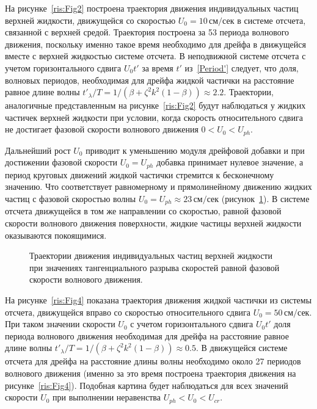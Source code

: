 На рисунке~\ref{ris:Fig2} построена траектория движения индивидуальных частиц верхней жидкости, движущейся со скоростью $ U_{0}=10\, \text{см/сек} $  в системе отсчета, связанной с верхней средой. 
Траектория построена за 53 периода волнового движения, поскольку именно такое время необходимо для дрейфа в движущейся вместе с верхней жидкостью системе отсчета. В неподвижной системе отсчета с учетом горизонтального сдвига $ U_{0} t' $ за время $ t'$  из~\eqref{Period'} следует, что доля, волновых периодов, необходимая для дрейфа жидкой частички на расстояние равное длине волны $ t'_{\lambda}/T=1/\left( \beta+\zeta^{2}k^{2}\left( 1-\beta \right) \right) \approx 2.2 $.
Траектории, аналогичные представленным на рисунке~\ref{ris:Fig2} будут наблюдаться у жидких частичек верхней жидкости при условии, когда скорость относительного сдвига не достигает фазовой скорости волнового движения $ 0<U_{0}<U_{ph} $.

Дальнейший рост $ U_{0} $ приводит к уменьшению модуля дрейфовой добавки и при достижении фазовой скорости $ U_{0}=U_{ph} $ добавка принимает нулевое значение, а период круговых движений жидкой частички стремится к бесконечному значению. Что соответствует равномерному и прямолинейному движению жидких частиц с фазовой скоростью волны $ U_{0}=U_{ph}\approx 23 \, \text{см/сек} $ (рисунок~\ref{ris:Fig3}). В системе отсчета движущейся в том же направлении со скоростью, равной фазовой скорости волнового движения поверхности, жидкие частицы верхней жидкости оказываются покоящимися.

\begin{figure}[ht]
	\caption{Траектории движения индивидуальных частиц верхней жидкости при значениях тангенциального разрыва скоростей равной фазовой скорости волнового движения.}
	\label{ris:Fig3}
\end{figure}

На рисунке~\ref{ris:Fig4} показана траектория движения жидкой частички из системы отсчета, движущейся вправо со скоростью относительного сдвига $ U_{0}=50\, \text{см/сек} $. При таком значении скорости $ U_{0} $ с учетом горизонтального сдвига $ U_{0} t' $ доля периода волнового движения необходимая для дрейфа на расстояние равное длине волны  $ t'_{\lambda}/T=1/\left( \beta+\zeta^{2}k^{2}\left( 1-\beta \right) \right) \approx 0.5 $. В движущейся системе отсчета для дрейфа на расстояние длины волны необходимо около 27 периодов волнового движения (именно за это время построена траектория движения на рисунке~\ref{ris:Fig4}).  Подобная картина будет наблюдаться для всех значений скорости $ U_{0} $ при выполнении неравенства $ U_{ph}<U_{0}<U_{cr} $.

